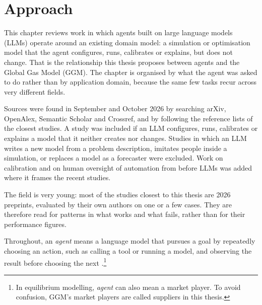 \section{Approach}

This chapter reviews work in which agents built on large language models (LLMs) operate around an existing domain model: a simulation or optimisation model that the agent configures, runs, calibrates or explains, but does not change.
That is the relationship this thesis proposes between agents and the Global Gas Model (GGM).
The chapter is organised by what the agent was asked to do rather than by application domain, because the same few tasks recur across very different fields.

Sources were found in September and October 2026 by searching arXiv, OpenAlex, Semantic Scholar and Crossref, and by following the reference lists of the closest studies.
A study was included if an LLM configures, runs, calibrates or explains a model that it neither creates nor changes.
Studies in which an LLM writes a new model from a problem description, imitates people inside a simulation, or replaces a model as a forecaster were excluded.
Work on calibration and on human oversight of automation from before LLMs was added where it frames the recent studies.

The field is very young: most of the studies closest to this thesis are 2026 preprints, evaluated by their own authors on one or a few cases.
They are therefore read for patterns in what works and what fails, rather than for their performance figures.

Throughout, an \emph{agent} means a language model that pursues a goal by repeatedly choosing an action, such as calling a tool or running a model, and observing the result before choosing the next \citep{yao2023react}.\footnote{In equilibrium modelling, \emph{agent} can also mean a market player.
To avoid confusion, GGM's market players are called suppliers in this thesis.}
